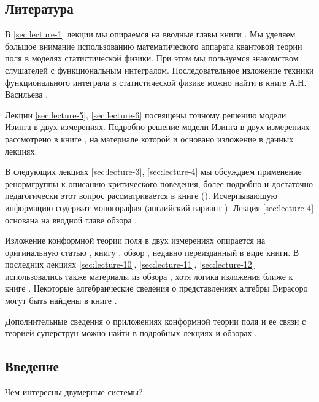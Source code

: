 \documentclass[a4paper,12pt]{article}
\theoremstyle{definition}
\theoremstyle{definition}
\theoremstyle{definition}
\begin{document}
\subsection{Литература}
\label{sec:literature}
В \ref{sec:lecture-1} лекции мы опираемся на вводные главы книги \cite{difrancesco1997cft}. Мы
уделяем большое внимание использованию математического аппарата квантовой теории поля в моделях
статистической физики. При этом мы пользуемся знакомством слушателей с функциональным интегралом.
Последовательное изложение техники функционального интеграла в статистической физике можно найти в
книге А.Н. Васильева \cite{vasiliev1976}.

Лекции \ref{sec:lecture-5}, \ref{sec:lecture-6} посвящены точному решению модели Изинга в двух
измерениях. Подробно решение модели Изинга в двух измерениях рассмотрено в книге
\cite{belavin2001lect}, на материале которой и основано изложение в данных лекциях.

В следующих лекциях \ref{sec:lecture-3}, \ref{sec:lecture-4} мы обсуждаем применение ренормгруппы к
описанию критического поведения, более подробно и достаточно педагогически этот вопрос
рассматривается в книге \cite{ma1980} (\cite{ma2000modern}). Исчерпывающую информацию содержит
моногорафия \cite{vasiliev1998} (английский вариант \cite{Vasilev:1027193}). Лекция
\ref{sec:lecture-4} основана на вводной главе обзора \cite{Ravanini:2000st}.

Изложение конформной теории поля в двух измерениях опирается на оригинальную статью
\cite{belavin1984ics}, книгу \cite{difrancesco1997cft}, обзор
\cite{zamolodchikov1989rus,zamolodchikov1989conformal}, недавно переизданный в виде книги. В
последних лекциях \ref{sec:lecture-10}, \ref{sec:lecture-11}, \ref{sec:lecture-12} использовались
также материалы из обзора \cite{Ginsparg:1988ui}, хотя логика изложения ближе к книге
\cite{difrancesco1997cft}. Некоторые алгебраические сведения о представлениях алгебры Вирасоро могут
быть найдены в книге \cite{golod2001}.

Дополнительные сведения о приложениях конформной теории поля и ее связи с теорией суперструн можно
найти в подробных лекциях \cite{springerlink:10.1134/S1063778810050108} и обзорах
\cite{Walton:1999xc}, \cite{gaberdiel2000icf}.

\subsection{Введение}
\label{sec:intro}
Чем интересны двумерные системы?
\end{document}
